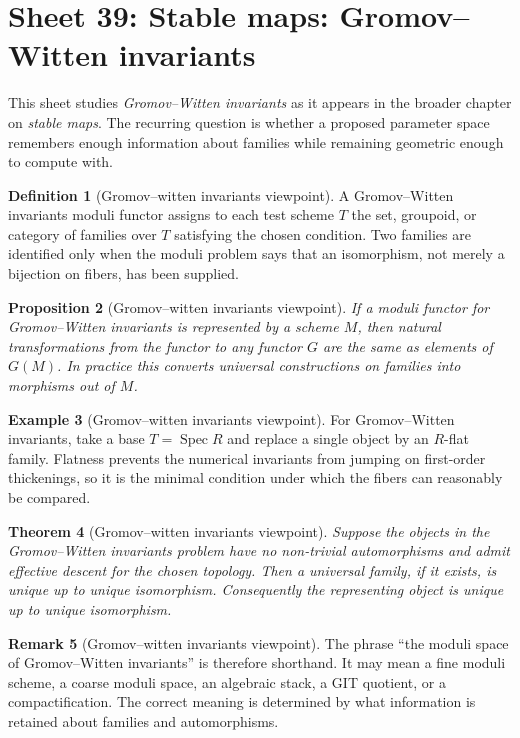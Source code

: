 \documentclass[11pt]{amsart}
\newtheorem{theorem}{Theorem}[section]
\newtheorem{proposition}[theorem]{Proposition}
\theoremstyle{definition}
\newtheorem{definition}[theorem]{Definition}
\newtheorem{example}[theorem]{Example}
\newtheorem{remark}[theorem]{Remark}
\newcommand{\Spec}{\operatorname{Spec}}
\begin{document}
\section{Sheet 39: Stable maps: Gromov--Witten invariants}
This sheet studies \emph{Gromov--Witten invariants} as it appears in the broader chapter on \emph{stable maps}.  The recurring question is whether a proposed parameter space remembers enough information about families while remaining geometric enough to compute with.
\begin{definition}[Gromov--witten invariants viewpoint]
A Gromov--Witten invariants moduli functor assigns to each test scheme $T$ the set, groupoid, or category of families over $T$ satisfying the chosen condition.  Two families are identified only when the moduli problem says that an isomorphism, not merely a bijection on fibers, has been supplied.
\end{definition}
\begin{proposition}[Gromov--witten invariants viewpoint]
If a moduli functor for Gromov--Witten invariants is represented by a scheme $M$, then natural transformations from the functor to any functor $G$ are the same as elements of $G(M)$.  In practice this converts universal constructions on families into morphisms out of $M$.
\end{proposition}
\begin{example}[Gromov--witten invariants viewpoint]
For Gromov--Witten invariants, take a base $T=\Spec R$ and replace a single object by an $R$-flat family.  Flatness prevents the numerical invariants from jumping on first-order thickenings, so it is the minimal condition under which the fibers can reasonably be compared.
\end{example}
\begin{theorem}[Gromov--witten invariants viewpoint]
Suppose the objects in the Gromov--Witten invariants problem have no non-trivial automorphisms and admit effective descent for the chosen topology.  Then a universal family, if it exists, is unique up to unique isomorphism.  Consequently the representing object is unique up to unique isomorphism.
\end{theorem}
\begin{remark}[Gromov--witten invariants viewpoint]
The phrase ``the moduli space of Gromov--Witten invariants'' is therefore shorthand.  It may mean a fine moduli scheme, a coarse moduli space, an algebraic stack, a GIT quotient, or a compactification.  The correct meaning is determined by what information is retained about families and automorphisms.
\end{remark}
\end{document}

